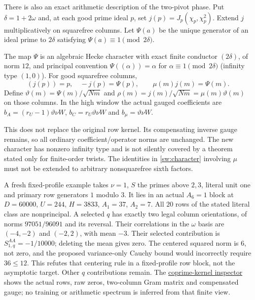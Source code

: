 There is also an exact arithmetic description of the two-pivot phase.
Put $\delta=1+2\omega$ and, at each good prime ideal $p$, set
$j(p)=J_p(\chi_p,\chi_p^2)$. Extend $j$ multiplicatively on squarefree
columns. Let $\Psi(a)$ be the unique generator of an ideal prime to
$2\delta$ satisfying $\Psi(a)\equiv1\pmod{2\delta}$.
\begin{proposition}\label{sw:twist}
The map $\Psi$ is an algebraic Hecke character with exact finite conductor
$(2\delta)$, of norm $12$, and principal convention
$\Psi((\alpha))=\alpha$ for $\alpha\equiv1\pmod{2\delta}$
(infinity type $(1,0)$). For good squarefree columns,
\begin{equation}\label{sw:character}
 (j(p))=p,\quad -j(p)=\Psi(p),\qquad
 \mu(m)j(m)=\Psi(m).
\end{equation}
Define $\vartheta(m)=\Psi(m)/\sqrt{Nm}$ and
$\rho(m)=j(m)/\sqrt{Nm}=\mu(m)\vartheta(m)$ on those columns.
In the high window the actual gauged coefficients are
$b_A=(r_U-1)\vartheta\nu W$, $b_C=r_U\vartheta\nu W$ and
$b_\mu=\vartheta\nu W$.
\end{proposition}
This does not replace the original row kernel. Its compensating inverse
gauge remains, so all ordinary coefficient/operator norms are unchanged.
The new character has nonzero infinity type and is not silently covered
by a theorem stated only for finite-order twists. The identities in
\eqref{sw:character} involving $\mu$ must not be extended to arbitrary
nonsquarefree sixth factors.

A fresh fixed-profile example takes $\nu=1$, $S$ the primes above $2,3$,
literal unit one and primary row generators $1$ modulo $3$. It lies in an
actual $A_6=1$ block at $D=60000$, $U=244$, $H=3833$, $A_1=37$, $A_2=7$.
All $20$ rows of the stated literal class are nonprincipal. A selected
$q$ has exactly two legal column orientations, of norms $97051/96091$
and its reversal. Their correlations in the $\omega$ basis are
$(-4,-2)$ and $(-2,2)$, with mean $-3$. Their selected contribution is
$S_{1,q}^{AA}=-1/10000$; deleting the mean gives zero.
The centered squared norm is $6$, not zero, and the proposed
variance-only Cauchy bound would incorrectly require $36\le12$.
This refutes that centering rule in a fixed-profile row block, not the
asymptotic target. Other $q$ contributions remain.
The \href{../profile-uniformity.html#fixed-h1}{coprime-kernel inspector}
shows the actual rows, raw zeros, two-column Gram matrix and compensated
gauge; no training or arithmetic spectrum is inferred from that finite view.
